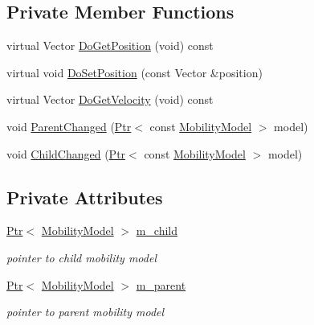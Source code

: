 \subsection*{Private Member Functions}
\begin{DoxyCompactItemize}
\item 
virtual Vector \hyperlink{classns3_1_1HierarchicalMobilityModel_a6fe2632548407b182d8ae369993c4f1b}{Do\+Get\+Position} (void) const 
\item 
virtual void \hyperlink{classns3_1_1HierarchicalMobilityModel_a484afa83a1a90737a901409279284296}{Do\+Set\+Position} (const Vector \&position)
\item 
virtual Vector \hyperlink{classns3_1_1HierarchicalMobilityModel_ad43e62f3ea6d73b3b4621959f3016f32}{Do\+Get\+Velocity} (void) const 
\item 
void \hyperlink{classns3_1_1HierarchicalMobilityModel_ad702b836af69d11308ef4735e8f77f63}{Parent\+Changed} (\hyperlink{classns3_1_1Ptr}{Ptr}$<$ const \hyperlink{classns3_1_1MobilityModel}{Mobility\+Model} $>$ model)
\item 
void \hyperlink{classns3_1_1HierarchicalMobilityModel_a48ec474c82848ebe47d0b182df0d1776}{Child\+Changed} (\hyperlink{classns3_1_1Ptr}{Ptr}$<$ const \hyperlink{classns3_1_1MobilityModel}{Mobility\+Model} $>$ model)
\end{DoxyCompactItemize}
\subsection*{Private Attributes}
\begin{DoxyCompactItemize}
\item 
\hyperlink{classns3_1_1Ptr}{Ptr}$<$ \hyperlink{classns3_1_1MobilityModel}{Mobility\+Model} $>$ \hyperlink{classns3_1_1HierarchicalMobilityModel_a07ebcdb83ae4934089832879b1b2f6ca}{m\+\_\+child}
\begin{DoxyCompactList}\small\item\em pointer to child mobility model \end{DoxyCompactList}\item 
\hyperlink{classns3_1_1Ptr}{Ptr}$<$ \hyperlink{classns3_1_1MobilityModel}{Mobility\+Model} $>$ \hyperlink{classns3_1_1HierarchicalMobilityModel_a5fba1ec797033befe2d231649919d3e0}{m\+\_\+parent}
\begin{DoxyCompactList}\small\item\em pointer to parent mobility model \end{DoxyCompactList}\end{DoxyCompactItemize}
